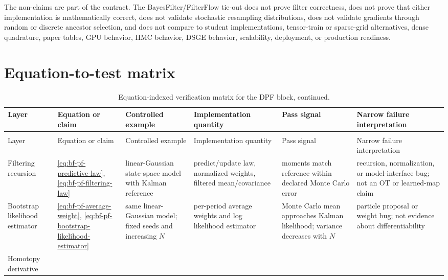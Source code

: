 The non-claims are part of the contract.  The BayesFilter/FilterFlow tie-out
does not prove filter correctness, does not prove that either implementation is
mathematically correct, does not validate stochastic resampling distributions,
does not validate gradients through random or discrete ancestor selection, and
does not compare to student implementations, tensor-train or sparse-grid
alternatives, dense quadrature, paper tables, GPU behavior, HMC behavior, DSGE
behavior, scalability, deployment, or production readiness.

\section{Equation-to-test matrix}
\label{sec:bf-dpf-debug-equation-test-matrix}

\begin{center}
\scriptsize
\begin{longtable}{@{}p{} p{} p{} p{} p{} p{}@{}}
\caption{Equation-indexed verification matrix for the DPF block.}
\label{tab:bf-dpf-debug-equation-test-matrix}\\
\toprule
Layer & Equation or claim & Controlled example & Implementation quantity & Pass signal & Narrow failure interpretation \\
\midrule
\endfirsthead
\caption[]{Equation-indexed verification matrix for the DPF block, continued.}\\
\toprule
Layer & Equation or claim & Controlled example & Implementation quantity & Pass signal & Narrow failure interpretation \\
\midrule
\endhead
\bottomrule
\endlastfoot
Filtering recursion &
\eqref{eq:bf-pf-predictive-law}, \eqref{eq:bf-pf-filtering-law} &
linear-Gaussian state-space model with Kalman reference &
predict/update law, normalized weights, filtered mean/covariance &
moments match reference within declared Monte Carlo error &
recursion, normalization, or model-interface bug; not an OT or learned-map claim \\
Bootstrap likelihood estimator &
\eqref{eq:bf-pf-average-weight}, \eqref{eq:bf-pf-bootstrap-likelihood-estimator} &
same linear-Gaussian model; fixed seeds and increasing $N$ &
per-period average weights and log likelihood estimator &
Monte Carlo mean approaches Kalman likelihood; variance decreases with $N$ &
particle proposal or weight bug; not evidence about differentiability \\
Homotopy derivative &

\end{longtable}
\end{center}
